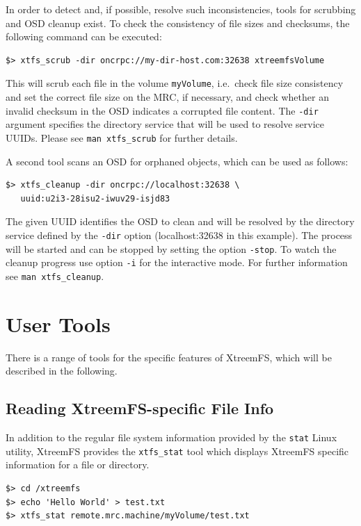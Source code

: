 \documentclass[a4paper,10pt]{book}
\begin{document}
In order to detect and, if possible, resolve such inconsistencies, tools for scrubbing and OSD cleanup exist. To check the consistency of file sizes and checksums, the following command can be executed:

\begin{verbatim}
$> xtfs_scrub -dir oncrpc://my-dir-host.com:32638 xtreemfsVolume
\end{verbatim}

This will scrub each file in the volume \texttt{myVolume}, i.e.\ check file size consistency and set the correct file size on the MRC, if necessary, and check whether an invalid checksum in the OSD indicates a corrupted file content. The \texttt{-dir} argument specifies the directory service that will be used to resolve service UUIDs. Please see \texttt{man xtfs\_scrub} for further details.

A second tool scans an OSD for orphaned objects, which can be used as follows:

\begin{verbatim}
$> xtfs_cleanup -dir oncrpc://localhost:32638 \
   uuid:u2i3-28isu2-iwuv29-isjd83
\end{verbatim}
The given UUID identifies the OSD to clean and will be resolved by the
directory service defined by the \texttt{-dir} option (localhost:32638 in this example).
The process will be started and can be stopped by setting the option
\texttt{-stop}. To watch the cleanup progress use option \texttt{-i} for the
interactive mode. For further information see \texttt{man xtfs\_cleanup}.

\section{User Tools}

There is a range of tools for the specific features of XtreemFS, which will be described in the following.

\subsection{Reading XtreemFS-specific File Info}

In addition to the regular file system information provided by the \texttt{stat} Linux utility, XtreemFS provides the \texttt{xtfs\_stat} tool which displays XtreemFS specific information for a file or directory.


\begin{verbatim}
$> cd /xtreemfs
$> echo 'Hello World' > test.txt
$> xtfs_stat remote.mrc.machine/myVolume/test.txt
\end{verbatim}
\end{document}
